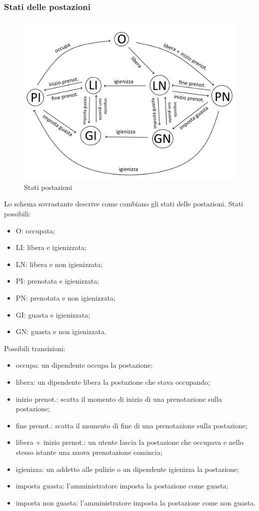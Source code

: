 \subsubsection{Stati delle postazioni}
\begin{figure}[H]
	\centering
	\includegraphics[width=15cm]{res/images/statipostazioni.png}
	\caption{Stati postazioni}
	\label{fig:stati postazioni}
\end{figure}
Lo schema sovrastante descrive come cambiano gli stati delle postazioni. \newline
Stati possibili:
\begin{itemize}
	\item O: occupata;
	\item LI: libera e igienizzata;
	\item LN: libera e non igienizzata;
	\item PI: prenotata e igienizzata;
	\item PN: prenotata e non igienizzata;
	\item GI: guasta e igienizzata;
	\item GN: guasta e non igienizzata.
\end{itemize}
Possibili transizioni:
\begin{itemize}
	\item occupa: un dipendente occupa la postazione;
	\item libera: un dipendente libera la postazione che stava occupando;
	\item inizio prenot.: scatta il momento di inizio di una prenotazione sulla postazione;
	\item fine prenot.: scatta il momento di fine di una prenotazione sulla postazione;
	\item libera + inizio prenot.: un utente lascia la postazione che occupava e nello stesso istante una nuova prenotazione comincia;
	\item igienizza: un addetto alle pulizie o un dipendente igienizza la postazione;
	\item imposta guasta: l'amministratore imposta la postazione come guasta;
	\item imposta non guasta: l'amministratore imposta la postazione come non guasta.
\end{itemize}

